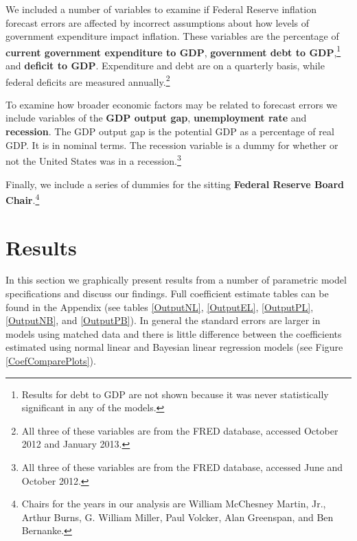 \documentclass[a4paper]{article}\usepackage{graphicx, color}
\begin{document}
We included a number of variables to examine if Federal Reserve inflation forecast errors are affected by incorrect assumptions about how levels of government expenditure impact inflation. These variables are the percentage of {\bf{current government expenditure to GDP}}, {\bf{government debt to GDP}},\footnote{Results for debt to GDP are not shown because it was never statistically significant in any of the models.} and \textbf{deficit to GDP}. Expenditure and debt are on a quarterly basis, while federal deficits are measured annually.\footnote{All three of these variables are from the FRED database, accessed October 2012 and January 2013.}

To examine how broader economic factors may be related to forecast errors we include variables of the {\bf{GDP output gap}}, {\bf{unemployment rate}} and {\bf{recession}}. The GDP output gap is the potential GDP as a percentage of real GDP. It is in nominal terms. The recession variable is a dummy for whether or not the United States was in a recession.\footnote{All three of these variables are from the FRED database, accessed June and October 2012.} 

Finally, we include a series of dummies for the sitting {\bf{Federal Reserve Board Chair}}.\footnote{Chairs for the years in our analysis are William McChesney Martin, Jr., Arthur Burns, G. William Miller, Paul Volcker, Alan Greenspan, and Ben Bernanke.}

\section{Results}

In this section we graphically present results from a number of parametric model specifications and discuss our findings. Full coefficient estimate tables can be found in the Appendix (see tables \ref{OutputNL}, \ref{OutputEL}, \ref{OutputPL}, \ref{OutputNB}, and \ref{OutputPB}). In general the standard errors are larger in models using matched data and there is little difference between the coefficients estimated using normal linear and Bayesian linear regression models (see Figure \ref{CoefComparePlots}). 
\end{document}
